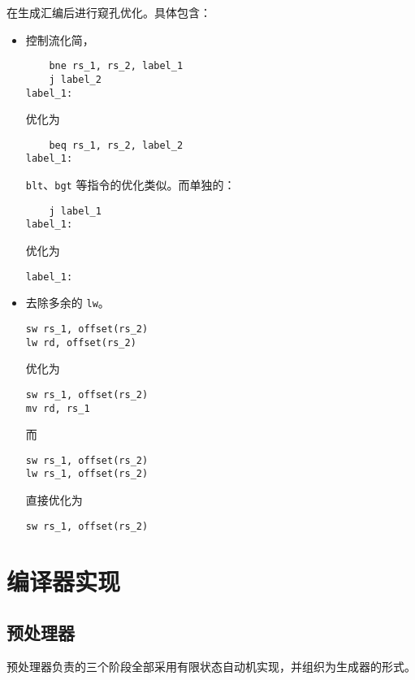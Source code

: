 在生成汇编后进行窥孔优化。具体包含：
\begin{itemize}
    \item 控制流化简，
\begin{verbatim}
    bne rs_1, rs_2, label_1
    j label_2
label_1:
\end{verbatim}
    优化为
    \begin{verbatim}
    beq rs_1, rs_2, label_2
label_1:
    \end{verbatim}
    \texttt{blt}、\texttt{bgt} 等指令的优化类似。而单独的：
    \begin{verbatim}
    j label_1
label_1:
    \end{verbatim}
        优化为
    \begin{verbatim}
label_1:
    \end{verbatim}
    \item 去除多余的 \texttt{lw}。
\begin{verbatim}
sw rs_1, offset(rs_2)
lw rd, offset(rs_2)
\end{verbatim}
    优化为
    \begin{verbatim}
sw rs_1, offset(rs_2)
mv rd, rs_1
    \end{verbatim}
    而
    \begin{verbatim}
sw rs_1, offset(rs_2)
lw rs_1, offset(rs_2)
\end{verbatim}
    直接优化为
    \begin{verbatim}
sw rs_1, offset(rs_2)
    \end{verbatim}
\end{itemize}
\section{编译器实现}
\subsection{预处理器}
预处理器负责的三个阶段全部采用有限状态自动机实现，并组织为生成器的形式。
